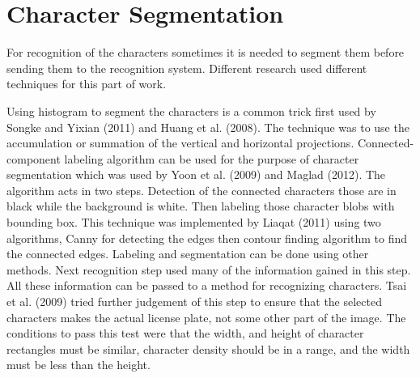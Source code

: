 \section{Character Segmentation}

For recognition of the characters sometimes it is needed to segment them before sending them to the recognition system. Different research used different techniques for this part of work.

Using histogram to segment the characters is a common trick first used by Songke and Yixian (2011) and Huang et al. (2008). The technique was to use the accumulation or summation of the vertical and horizontal projections. Connected-component labeling algorithm can be used for the purpose of character segmentation which was used by Yoon et al. (2009) and Maglad (2012). The algorithm acts in two steps. Detection of the connected characters those are in black while the background is white. Then labeling those character blobs with bounding box. This technique was implemented by Liaqat (2011) using two algorithms, Canny for detecting the edges then contour finding algorithm to find the connected edges. Labeling and segmentation can be done using other methods. Next recognition step used many of the information gained in this step. All these information can be passed to a method for recognizing characters. Tsai et al. (2009) tried further judgement of this step to ensure that the selected characters makes the actual license plate, not some other part of the image. The conditions to pass this test were that the width, and height of character rectangles must be similar, character density should be in a range, and the width must be less than the height.